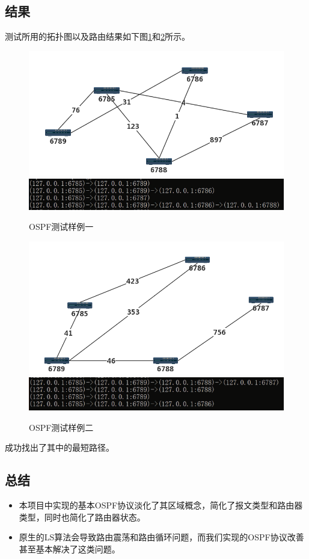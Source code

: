 	\subsection{结果} %
	\label{sub:结果}
		测试所用的拓扑图以及路由结果如下图\ref{fig:ospfTest1}和\ref{fig:ospfTest2}所示。
		\begin{figure}[H]
			\centering
			\includegraphics[scale=0.4]{imgs/topo2/tpop1.png}
			\includegraphics[scale=1]{imgs/ospfTest1.PNG}
			\caption{OSPF测试样例一}
			\label{fig:ospfTest1}
		\end{figure}
		\begin{figure}[H]
			\centering
			\includegraphics[scale=0.4]{imgs/topo2/topo2.png}
			\includegraphics[scale=1]{imgs/ospfTest2.PNG}
			\caption{OSPF测试样例二}
			\label{fig:ospfTest2}
		\end{figure}
		成功找出了其中的最短路径。
	\subsection{总结} %
	\label{sub:总结}
		\begin{itemize}
			\item 本项目中实现的基本OSPF协议淡化了其区域概念，简化了报文类型和路由器类型，同时也简化了路由器状态。
			\item 原生的LS算法会导致路由震荡和路由循环问题，而我们实现的OSPF协议改善甚至基本解决了这类问题。
		\end{itemize}
		
	

